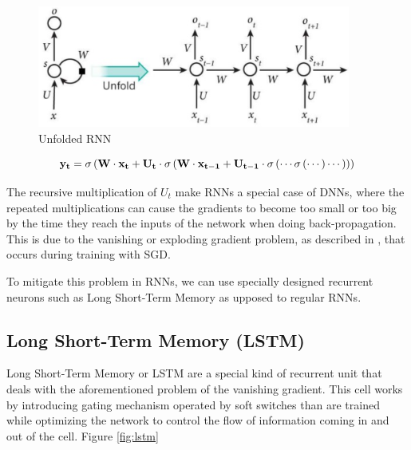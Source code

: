 \begin{figure}
    \centering
    \includegraphics[height=4cm]{figures/unfold}
    \caption{Unfolded RNN}
    \label{fig:unfold}
\end{figure}

\begin{equation}
    \centering
    \mathbf{y_t} = \sigma \left ( \mathbf{W} \cdot \mathbf{x_t} + \mathbf{U_t} \cdot \sigma \left ( \mathbf{W} \cdot \mathbf{x_{t-1}} + \mathbf{U_{t-1}} \cdot \sigma \left ( \cdots \sigma \left ( \cdots \right ) \cdots \right ) \right ) \right )
    \label{eq:out-rec-expanded}
\end{equation}

The recursive multiplication of $U_t$ make RNNs a special case of DNNs, where the repeated multiplications can cause the gradients to become too small or too big by the time they reach the inputs of the network when doing back-propagation. This is due to the vanishing or exploding gradient problem, as described in \cite{bengio1994learning}, that occurs during training with SGD.

To mitigate this problem in RNNs, we can use specially designed recurrent neurons such as Long Short-Term Memory as upposed to regular RNNs.

\subsection{Long Short-Term Memory (LSTM)}

Long Short-Term Memory \cite{hochreiter1997long} or LSTM are a special kind of recurrent unit that deals with the aforementioned problem of the vanishing gradient. This cell works by introducing gating mechanism operated by soft switches than are trained while optimizing the network to control the flow of information coming in and out of the cell. Figure \ref{fig:lstm}

